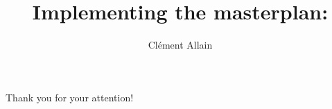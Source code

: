 \documentclass[aspectratio=169, xcolor=dvipsnames]{beamer}
\title{
  Implementing the \raisebox{-0.2cm}{\texttt{[image: images/iris.png]}} masterplan: \OCaml
}
\author{
  Clément Allain
}
\begin{document}

\begin{frame}
\titlepage
\end{frame}









\begin{frame}
\centering
\huge
Thank you for your attention!
\end{frame}

\end{document}
